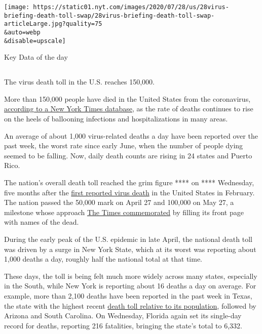 \texttt{[image: https://static01.nyt.com/images/2020/07/28/us/28virus-briefing-death-toll-swap/28virus-briefing-death-toll-swap-articleLarge.jpg?quality=75\\\&auto=webp\\\&disable=upscale]}

Key Data of the day

\subsection{}

The virus death toll in the U.S. reaches 150,000.

More than 150,000 people have died in the United States from the
coronavirus,
\href{https://www.nytimes.com/interactive/2020/us/coronavirus-us-cases.html}{according
to a New York Times database}, as the rate of deaths continues to rise
on the heels of ballooning infections and hospitalizations in many
areas.

An average of about 1,000 virus-related deaths a day have been reported
over the past week, the worst rate since early June, when the number of
people dying seemed to be falling. Now, daily death counts are rising in
24 states and Puerto Rico.

The nation's overall death toll reached the grim figure **** on ****
Wednesday, five months after the
\href{https://www.nytimes.com/2020/02/29/us/coronavirus-washington-death.html}{first
reported virus death} in the United States in February. The nation
passed the 50,000 mark on April 27 and 100,000 on May 27, a milestone
whose approach
\href{https://www.nytimes.com/interactive/2020/05/24/us/us-coronavirus-deaths-100000.html}{The
Times commemorated} by filling its front page with names of the dead.

During the early peak of the U.S. epidemic in late April, the national
death toll was driven by a surge in New York State, which at its worst
was reporting about 1,000 deaths a day, roughly half the national total
at that time.

These days, the toll is being felt much more widely across many states,
especially in the South, while New York is reporting about 16 deaths a
day on average. For example, more than 2,100 deaths have been reported
in the past week in Texas, the state with the highest recent
\href{https://www.nytimes.com/interactive/2020/us/coronavirus-us-cases.html}{death
toll relative to its population}, followed by Arizona and South
Carolina. On Wednesday, Florida again set its single-day record for
deaths, reporting 216 fatalities, bringing the state's total to 6,332.

